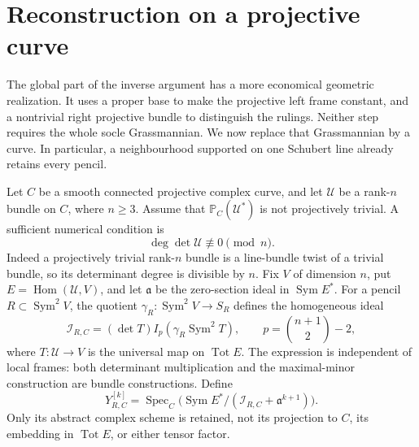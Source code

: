 \documentclass[11pt,reqno]{amsart}
\numberwithin{equation}{section}
\theoremstyle{definition}\newtheorem{definition}[theorem]{Definition}
\theoremstyle{remark}\newtheorem{remark}[theorem]{Remark}
\newcommand{\Pj}{\mathbb P}\newcommand{\A}{\mathbb A}
\DeclareMathOperator{\Sym}{Sym}\DeclareMathOperator{\Gr}{Gr}
\DeclareMathOperator{\Hom}{Hom}\DeclareMathOperator{\Tot}{Tot}
\DeclareMathOperator{\Spec}{Spec}\DeclareMathOperator{\PGL}{PGL}
\begin{document}

\section{Reconstruction on a projective curve}
\label{sec:curve-recognition-v145}

The global part of the inverse argument has a more economical geometric
realization.  It uses a proper base to make the projective left frame
constant, and a nontrivial right projective bundle to distinguish the
rulings.  Neither step requires the whole socle Grassmannian.  We now
replace that Grassmannian by a curve.  In particular, a neighbourhood
supported on one Schubert line already retains every pencil.

Let \(C\) be a smooth connected projective complex curve, and let
\(\mathcal U\) be a rank-\(n\) bundle on \(C\), where \(n\ge3\).
Assume that \(\Pj_C(\mathcal U^*)\) is not projectively trivial.
A sufficient numerical condition is
\begin{equation}\label{eq:curve-degree-obstruction-v145}
                 \deg\det\mathcal U\not\equiv0\pmod n.
\end{equation}
Indeed a projectively trivial rank-\(n\) bundle is a line-bundle twist
of a trivial bundle, so its determinant degree is divisible by \(n\).
Fix \(V\) of dimension \(n\), put \(E=\Hom(\mathcal U,V)\),
and let \(\mathfrak a\) be the zero-section ideal in
\(\Sym E^*\).  For a pencil \(R\subset\Sym^2V\), the quotient
\(\gamma_R:\Sym^2V\to S_R\) defines the homogeneous ideal
\begin{equation}\label{eq:curve-failure-ideal-v145}
 \mathcal I_{R,C}=(\det T)I_p(\gamma_R\Sym^2T),
 \qquad p=\binom{n+1}{2}-2,
\end{equation}
where \(T:\mathcal U\to V\) is the universal map on \(\Tot E\).
The expression is independent of local frames: both determinant
multiplication and the maximal-minor construction are bundle
constructions.  Define
\[
 Y_{R,C}^{[k]}=\Spec_C\bigl(\Sym E^*/
             (\mathcal I_{R,C}+\mathfrak a^{k+1})\bigr).
\]
Only its abstract complex scheme is retained, not its projection to
\(C\), its embedding in \(\Tot E\), or either tensor factor.
\end{document}
